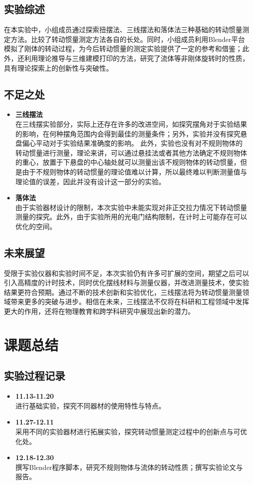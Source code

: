\documentclass[12pt,hyperref,a4paper,UTF8]{ctexart}
\begin{document}
\subsection{实验综述}
在本实验中，小组成员通过探索扭摆法、三线摆法和落体法三种基础的转动惯量测定方法。比较了转动惯量测定方法各自的长处。同时，小组成员利用Blender平台模拟了刚体的转动过程，为今后转动惯量的测定实验提供了一定的参考和借鉴；此外，还利用理论推导与三维建模打印的方法，研究了流体等非刚体旋转时的性质，具有理论探索上的创新性与突破性。
\subsection{不足之处}
    \begin{itemize}
        \item \textbf{三线摆法} \\
        在三线摆实验部分，实际上还存在许多的改进空间，如探究摆角对于实验结果的影响，在何种摆角范围内会得到最佳的测量条件；另外，实验并没有探究悬盘偏心平动对于实验结果准确度的影响。
        此外，实验也没有对不规则物体的转动惯量进行测量，理论来讲，可以通过悬挂法或者其他方法确定不规则物体的重心，放置于下悬盘的中心轴处就可以测量出该不规则物体的转动惯量，但是由于不规则物体的转动惯量的理论值难以计算，所以最终难以判断测量值与理论值的误差，因此并没有设计这一部分的实验。
        \item \textbf{落体法} \\
        由于实验器材设计的限制，本次实验中未能实现对非正交拉力情况下转动惯量测量的探究。此外，由于实验所用的光电门结构限制，在计时上可能存在可以优化的空间。
    \end{itemize}
\subsection{未来展望}
    受限于实验仪器和实验时间不足，本次实验仍有许多可扩展的空间，期望之后可以引入高精度的计时技术，同时优化摆线材料与测量仪器，并改进测量技术，使实验结果更符合预期。通过不断的技术创新和实验优化，三线摆法将为转动惯量测量领域带来更多的突破与进步。相信在未来，三线摆法不仅将在科研和工程领域中发挥更大的作用，还将在物理教育和跨学科研究中展现出新的潜力。
\section{课题总结}
\subsection{实验过程记录}
\begin{itemize}
    \item \textbf{11.13-11.20} \\
        进行基础实验，探究不同器材的使用特性与特点。
    \item \textbf{11.27-12.11} \\
        采用不同的实验器材进行拓展实验，探究转动惯量测定过程中的创新点与可优化处。
    \item \textbf{12.18-12.30} \\
        撰写Blender程序脚本，研究不规则物体与流体的转动性质；撰写实验论文与报告。
\end{itemize}
\end{document}
